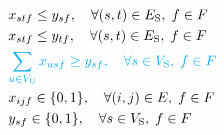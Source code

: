 \documentclass[10pt, letterpaper]{IEEEtran}
\newcommand\cyan[1]{\textcolor{cyan}{#1}}
\begin{document}
\begin{CJK}{UTF8}{ipxm}
{\begin{subequations}
\begin{align}
  &x_{stf} \le y_{sf}, \quad \forall (s,t) \in E_{\rm{S}}, \; f \in F \label{OSA-PSO j} \\
  &x_{stf} \le y_{tf}, \quad \forall (s,t) \in E_{\rm{S}}, \; f \in F \label{OSA-PSO k} \\
  &\cyan{\sum_{u \in V_{\rm{U}}} x_{usf} \geq y_{sf} , \quad \forall s \in V_{\rm{S}}, \; f \in F} \label{OSA-PSO l} \\
  &x_{ijf} \in \{0,1\}, \quad \forall (i,j) \in E, \; f \in F \label{OSA-PSO m} \\
  &y_{sf} \in \{0,1\}, \quad \forall s \in V_{\rm{S}}, \; f \in F \label{OSA-PSO n}
  \end{align}
\end{subequations}
}

\end{CJK}
\end{document}
